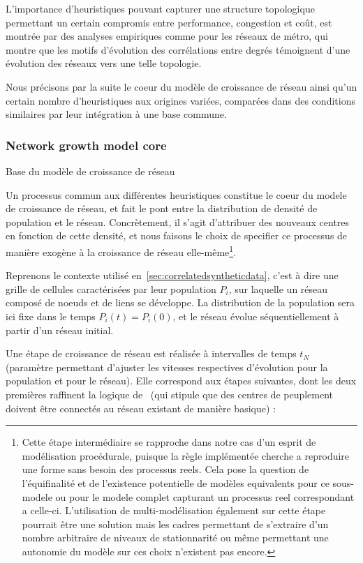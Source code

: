 L'importance d'heuristiques pouvant capturer une structure topologique permettant un certain compromis entre performance, congestion et coût, est montrée par des analyses empiriques comme \cite{2012arXiv1202.1747W} pour les réseaux de métro, qui montre que les motifs d'évolution des corrélations entre degrés témoignent d'une évolution des réseaux vers une telle topologie.


Nous précisons par la suite le coeur du modèle de croissance de réseau ainsi qu'un certain nombre d'heuristiques aux origines variées, comparées dans des conditions similaires par leur intégration à une base commune.


\subsubsection{Network growth model core}{Base du modèle de croissance de réseau}


Un processus commun aux différentes heuristiques constitue le coeur du modele de croissance de réseau, et fait le pont entre la distribution de densité de population et le réseau. Concrètement, il s'agit d'attribuer des nouveaux centres en fonction de cette densité, et nous faisons le choix de specifier ce processus de manière exogène à la croissance de réseau elle-même\footnote{Cette étape intermédiaire se rapproche dans notre cas d'un esprit de modélisation procédurale, puisque la règle implémentée cherche a reproduire une forme sans besoin des processus reels. Cela pose la question de l'équifinalité et de l'existence potentielle de modèles equivalents pour ce sous-modele ou pour le modele complet capturant un processus reel correspondant a celle-ci. L'utilisation de multi-modélisation également sur cette étape pourrait être une solution mais les cadres permettant de s'extraire d'un nombre arbitraire de niveaux de stationnarité ou même permettant une autonomie du modèle sur ces choix n'existent pas encore.}.


Reprenons le contexte utilisé en~\ref{sec:correlatedsyntheticdata}, c'est à dire une grille de cellules caractérisées par leur population $P_i$, sur laquelle un réseau composé de noeuds et de liens se développe. La distribution de la population sera ici fixe dans le temps $P_i(t) = P_i(0)$, et le réseau évolue séquentiellement à partir d'un réseau initial.

Une étape de croissance de réseau est réalisée à intervalles de temps $t_N$ (paramètre permettant d'ajuster les vitesses respectives d'évolution pour la population et pour le réseau). Elle correspond aux étapes suivantes, dont les deux premières raffinent la logique de~\cite{raimbault2014hybrid} (qui stipule que des centres de peuplement doivent être connectés au réseau existant de manière basique) :

